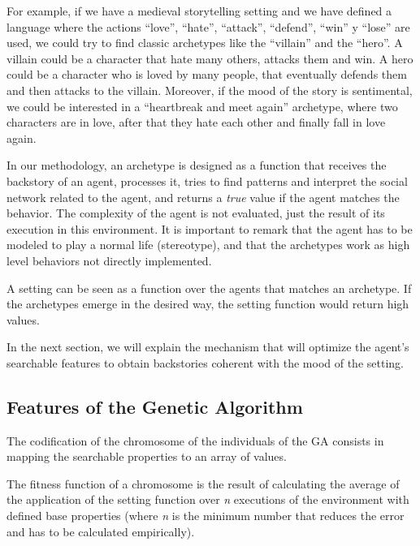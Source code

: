 \documentclass[letterpaper]{article}
\begin{document}
For example, if we have a medieval storytelling setting and we have defined a language where the actions ``love'', ``hate'', ``attack'', ``defend'', ``win'' y ``lose'' are used, we could try to find classic 
archetypes like the ``villain'' and the ``hero''. A villain could be a character that hate many others, attacks them and win. A hero could be a character who is loved by many people, that eventually defends them and then attacks to the villain. Moreover, if the mood of the story is sentimental, we could be interested in a ``heartbreak and meet again'' archetype, where two characters are in love, after that they hate each other and finally fall in love again.

In our methodology, an archetype is designed as a function that receives the backstory of an agent, processes it, tries to find patterns and interpret the social network related to the agent, and returns a {\em true} value if the agent matches the behavior. 
The complexity of the agent is not evaluated, just the result of its execution in this environment. It is important to remark that the agent has to be modeled to play a normal life (stereotype), and that the archetypes work as high level behaviors not directly implemented.

A setting can be seen as a function over the agents that matches an archetype. If the archetypes emerge in the desired way, the setting function would return high values.

In the next section, we will explain the mechanism that will optimize the agent's searchable features to obtain backstories coherent with the mood of the setting.

\subsection{Features of the Genetic Algorithm}


The codification of the chromosome of the individuals of the GA consists in mapping the searchable properties to an array of values. %

The fitness function of a chromosome is the result of calculating the average of the application of the setting function over \textit{n} executions of the environment with defined base properties (where \textit{n} is the minimum number that reduces the error and has to be calculated empirically).
\end{document}
